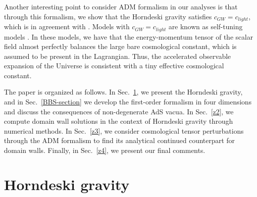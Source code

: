 \documentclass[aps,12pt, a4paper,nofootinbib]{revtex4}
\begin{document}
{Another interesting point to consider ADM formalism in our analyses is that through this formalism, we show that the Horndeski gravity satisfies $c_{GW}=c_{light}$, which is in agreement with \cite{Bahamonde:2019ipm,Bahamonde:2019shr,Ezquiaga:2017ekz,Creminelli:2017sry,Baker:2017hug}. Models with $c_{GW}=c_{light}$ are known as self-tuning models \cite{Charmousis:2011bf,Charmousis:2011ea,Babichev:2017lmw,Arratia:2020hoy}. In these models, we have that the energy-momentum tensor of the scalar field almost perfectly balances the large bare cosmological constant, which is assumed to be present in the Lagrangian. Thus, the accelerated observable expansion of the Universe is consistent with a tiny effective cosmological constant.


The paper is organized as follows. In Sec.~\ref{z1}, we present the Horndeski gravity, and in Sec.~\ref{BBS-section} we develop the first-order formalism in four dimensions and discuss the consequences of non-degenerate AdS vacua. In Sec.~\ref{z2}, we compute domain wall solutions in the context of Horndeski gravity through numerical methods. In Sec.~\ref{z3}, we consider cosmological tensor perturbations through the ADM formalism \cite{Kob}  to  find its analytical continued counterpart for domain walls. Finally, in Sec.~\ref{z4}, we present our final comments.

\section{Horndeski gravity}\label{z1}

}
\end{document}
